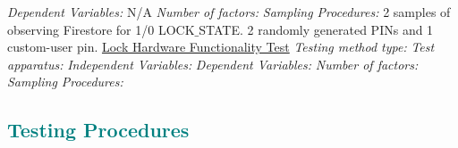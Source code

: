 \textit{Dependent Variables:} N/A
\newline
\textit{Number of factors:}
\newline
\textit{Sampling Procedures:} 2 samples of observing Firestore for 1/0 LOCK$\_$STATE. 2 randomly generated PINs and 1 custom-user pin.
\newline
\newline
\underline{Lock Hardware Functionality Test}
\newline
\textit{Testing method type:} 
\newline
\textit{Test apparatus:} 
\newline
\textit{Independent Variables:} 
\newline
\textit{Dependent Variables:} 
\newline
\textit{Number of factors:}
\newline
\textit{Sampling Procedures:} 
\newline
\textcolor{teal}{\subsection{Testing Procedures}}